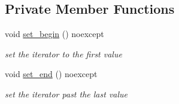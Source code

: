 \subsection*{Private Member Functions}
\begin{DoxyCompactItemize}
\item 
void \mbox{\hyperlink{classnlohmann_1_1detail_1_1iter__impl_a5d5f92c7f6848814bc82cf7e4e541820}{set\+\_\+begin}} () noexcept
\begin{DoxyCompactList}\small\item\em set the iterator to the first value \end{DoxyCompactList}\item 
void \mbox{\hyperlink{classnlohmann_1_1detail_1_1iter__impl_a23e50ad4c13aa62d9ac7f60a123823ee}{set\+\_\+end}} () noexcept
\begin{DoxyCompactList}\small\item\em set the iterator past the last value \end{DoxyCompactList}\end{DoxyCompactItemize}
